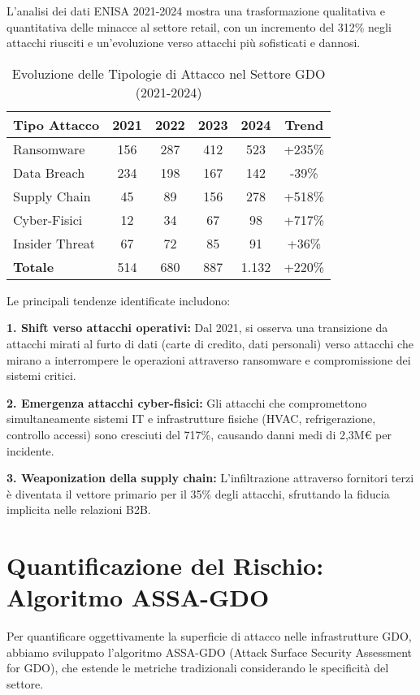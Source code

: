 L'analisi dei dati ENISA 2021-2024 mostra una trasformazione qualitativa e quantitativa delle minacce al settore retail, con un incremento del 312\% negli attacchi riusciti e un'evoluzione verso attacchi più sofisticati e dannosi.

\begin{table}[htbp]
\centering
\caption{Evoluzione delle Tipologie di Attacco nel Settore GDO (2021-2024)}
\label{tab:evoluzione_attacchi}
\begin{tabular}{lccccc}
\toprule
\textbf{Tipo Attacco} & \textbf{2021} & \textbf{2022} & \textbf{2023} & \textbf{2024} & \textbf{Trend} \\
\midrule
Ransomware & 156 & 287 & 412 & 523 & +235\% \\
Data Breach & 234 & 198 & 167 & 142 & -39\% \\
Supply Chain & 45 & 89 & 156 & 278 & +518\% \\
Cyber-Fisici & 12 & 34 & 67 & 98 & +717\% \\
Insider Threat & 67 & 72 & 85 & 91 & +36\% \\
\midrule
\textbf{Totale} & 514 & 680 & 887 & 1.132 & +220\% \\
\bottomrule
\end{tabular}
\end{table}

Le principali tendenze identificate includono:

\textbf{1. Shift verso attacchi operativi:} Dal 2021, si osserva una transizione da attacchi mirati al furto di dati (carte di credito, dati personali) verso attacchi che mirano a interrompere le operazioni attraverso ransomware e compromissione dei sistemi critici.

\textbf{2. Emergenza attacchi cyber-fisici:} Gli attacchi che compromettono simultaneamente sistemi IT e infrastrutture fisiche (HVAC, refrigerazione, controllo accessi) sono cresciuti del 717\%, causando danni medi di 2,3M€ per incidente.

\textbf{3. Weaponization della supply chain:} L'infiltrazione attraverso fornitori terzi è diventata il vettore primario per il 35\% degli attacchi, sfruttando la fiducia implicita nelle relazioni B2B.

\section{Quantificazione del Rischio: Algoritmo ASSA-GDO}
\label{sec:assa_gdo}

Per quantificare oggettivamente la superficie di attacco nelle infrastrutture GDO, abbiamo sviluppato l'algoritmo ASSA-GDO (Attack Surface Security Assessment for GDO), che estende le metriche tradizionali considerando le specificità del settore.

